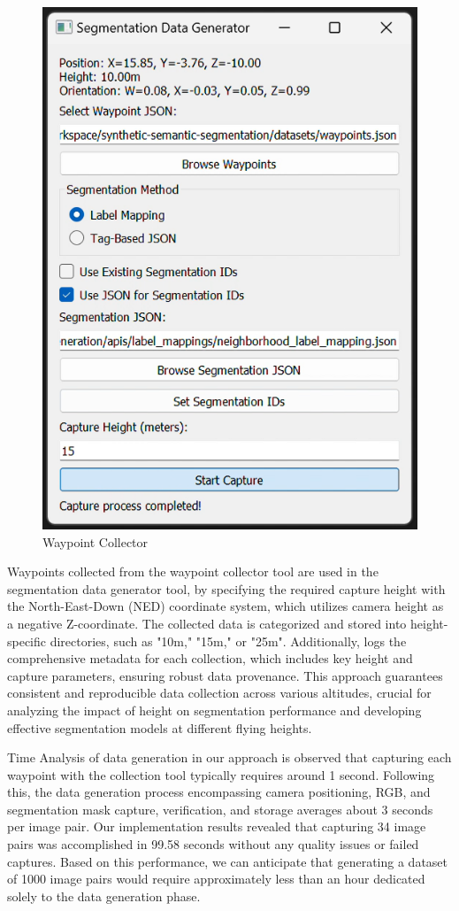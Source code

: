 \documentclass[../report.tex]{subfiles}
\begin{document}
     \begin{figure}
        \centering
        \includegraphics[width=0.5\linewidth]{figures/segmentation_data_generator.png}
        \caption{Waypoint Collector}
        \label{fig:enter-label}
    \end{figure}
    
     Waypoints collected from the waypoint collector tool are used in the segmentation data generator tool, by specifying the required capture height with the North-East-Down (NED) coordinate system, which utilizes camera height as a negative Z-coordinate. The collected data is categorized and stored into height-specific directories, such as "10m," "15m," or "25m". Additionally, logs the comprehensive metadata for each collection, which includes key height and capture parameters, ensuring robust data provenance. This approach guarantees consistent and reproducible data collection across various altitudes, crucial for analyzing the impact of height on segmentation performance and developing effective segmentation models at different flying heights.

     Time Analysis of data generation in our approach is observed that capturing each waypoint with the collection tool typically requires around 1 second. Following this, the data generation process encompassing camera positioning, RGB, and segmentation mask capture, verification, and storage averages about 3 seconds per image pair. Our implementation results revealed that capturing 34 image pairs was accomplished in 99.58 seconds without any quality issues or failed captures. Based on this performance, we can anticipate that generating a dataset of 1000 image pairs would require approximately less than an hour dedicated solely to the data generation phase.
\end{document}
